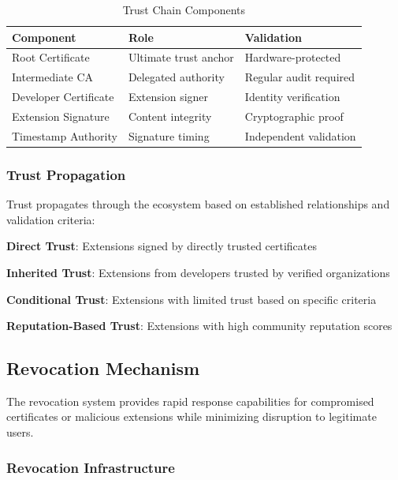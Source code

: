 \begin{table}[h]
\centering
\caption{Trust Chain Components}
\label{tab:trust-chain-components}
\begin{tabular}{@{}lll@{}}
\toprule
\textbf{Component} & \textbf{Role} & \textbf{Validation} \\
\midrule
Root Certificate & Ultimate trust anchor & Hardware-protected \\
Intermediate CA & Delegated authority & Regular audit required \\
Developer Certificate & Extension signer & Identity verification \\
Extension Signature & Content integrity & Cryptographic proof \\
Timestamp Authority & Signature timing & Independent validation \\
\bottomrule
\end{tabular}
\end{table}

\subsubsection{Trust Propagation}
\label{subsubsec:trust-propagation}

Trust propagates through the ecosystem based on established relationships and validation criteria:

\begin{compactlist}
\item \textbf{Direct Trust}: Extensions signed by directly trusted certificates
\item \textbf{Inherited Trust}: Extensions from developers trusted by verified organizations
\item \textbf{Conditional Trust}: Extensions with limited trust based on specific criteria
\item \textbf{Reputation-Based Trust}: Extensions with high community reputation scores
\end{compactlist}

\subsection{Revocation Mechanism}
\label{subsec:revocation-mechanism}

The revocation system provides rapid response capabilities for compromised certificates or malicious extensions while minimizing disruption to legitimate users.

\subsubsection{Revocation Infrastructure}
\label{subsubsec:revocation-infrastructure}

